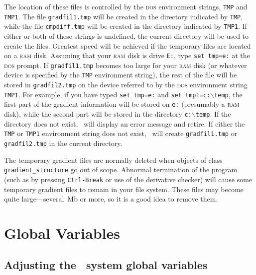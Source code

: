 \documentclass{admbmanual}
\newcommand\bs{$\backslash$}
\begin{document}
The location of these files
is controlled by the \textsc{dos} environment strings, \texttt{TMP} and \texttt{TMP1}.
The file \texttt{gradfil1.tmp} will be created in the directory
indicated by \texttt{TMP}, while the file
\texttt{cmpdiff.tmp} will be created in the directory indicated by 
 \texttt{TMP1}. If either or both of these strings is undefined, the 
current directory will be used to create the files.
Greatest speed will be achieved if the temporary files are located on a
\textsc{ram} disk. Assuming that your \textsc{ram} disk is drive \texttt{E:}, type 
\texttt{set tmp=e:} at the \textsc{dos} prompt. If \texttt{gradfil1.tmp} becomes
too large for your \textsc{ram} disk (or whatever device is specified by the
\texttt{TMP} environment string), the rest of the file will be stored in
\texttt{gradfil2.tmp} on 
the device referred to by the \textsc{dos} environment string \texttt{TMP1}. 
For example, if you have typed \texttt{set tmp=e:} and
\texttt{set tmp1=c:\bs temp}, 
the first part of the gradient information will be stored on \texttt{e:} 
(presumably a \textsc{ram} disk), while the second part will
be stored in the directory \texttt{c:\bs temp}. 
If the directory does not exist, \scAD\ will display
an error message and retire. If either the \texttt{TMP} or \texttt{TMP1} 
environment string does not
exist, \scAD\ will create \texttt{gradfil1.tmp} or \texttt{gradfil2.tmp} 
in the current directory.

The temporary gradient files are normally deleted when objects of class 
\texttt{gradient\_structure} go out of scope. Abnormal termination of
the program (such as by pressing \texttt{Ctrl-Break} or use of the derivative
checker) will cause some temporary gradient files to remain
in your file system. These files may become quite large---several~Mb or more,
 so it is a good idea to remove them.



\chapter{Global Variables}


\section{Adjusting the \scAD\ system global variables}
\end{document}
